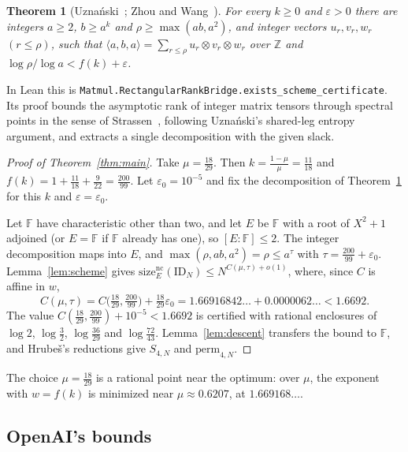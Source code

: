 \documentclass[11pt]{article}
\newtheorem{theorem}{Theorem}[section]
\theoremstyle{definition}
\theoremstyle{remark}
\newcommand{\F}{\mathbb{F}}
\newcommand{\Z}{\mathbb{Z}}
\newcommand{\ID}{\mathrm{ID}}
\newcommand{\size}{\mathrm{size}^{\mathrm{nc}}}
\newcommand{\lean}[1]{\texttt{#1}}
\begin{document}
\begin{theorem}[Uzna\'nski~\cite{Uznanski2026}; Zhou and Wang~\cite{ZhouWang2026}]\label{thm:uz}
For every $k\ge0$ and $\varepsilon>0$ there are integers $a\ge2$, $b\ge a^k$ and $\rho\ge\max(ab,a^2)$, and
integer vectors $u_r,v_r,w_r$ $(r\le\rho)$, such that $\langle a,b,a\rangle=\sum_{r\le\rho}u_r\otimes v_r\otimes
w_r$ over $\Z$ and $\log\rho/\log a<f(k)+\varepsilon$.
\end{theorem}

In Lean this is \lean{Matmul.RectangularRankBridge.exists\_scheme\_certificate}. Its proof bounds the asymptotic
rank of integer matrix tensors through spectral points in the sense of Strassen~\cite{Strassen1988}, following
Uzna\'nski's shared-leg entropy argument, and extracts a single decomposition with the given slack.

\begin{proof}[Proof of Theorem~\ref{thm:main}]
Take $\mu=\frac{18}{29}$. Then $k=\frac{1-\mu}{\mu}=\frac{11}{18}$ and $f(k)=1+\frac{11}{18}+\frac{9}{22}=\frac{200}{99}$.
Let $\varepsilon_0=10^{-5}$ and fix the decomposition of Theorem~\ref{thm:uz} for this $k$ and $\varepsilon=\varepsilon_0$.

Let $\F$ have characteristic other than two, and let $E$ be $\F$ with a root of $X^2+1$ adjoined (or $E=\F$ if
$\F$ already has one), so $[E:\F]\le2$. The integer decomposition maps into $E$, and
$\max(\rho,ab,a^2)=\rho\le a^{\tau}$ with $\tau=\frac{200}{99}+\varepsilon_0$. Lemma~\ref{lem:scheme} gives
$\size_E(\ID_N)\le N^{C(\mu,\tau)+o(1)}$, where, since $C$ is affine in $w$,
\[
C(\mu,\tau)=C\bigl(\tfrac{18}{29},\tfrac{200}{99}\bigr)+\tfrac{18}{29}\varepsilon_0
=1.66916842\ldots+0.0000062\ldots<1.6692 .
\]
The value $C(\frac{18}{29},\frac{200}{99})+10^{-5}<1.6692$ is certified with rational enclosures of $\log2$,
$\log\frac32$, $\log\frac{36}{29}$ and $\log\frac{72}{43}$. Lemma~\ref{lem:descent} transfers the bound to $\F$, and
Hrube\v{s}'s reductions give $S_{4,N}$ and $\mathrm{perm}_{4,N}$.
\end{proof}

The choice $\mu=\frac{18}{29}$ is a rational point near the optimum: over $\mu$, the exponent with $w=f(k)$ is
minimized near $\mu\approx0.6207$, at $1.669168\ldots$.

\subsection{OpenAI's bounds}\label{sec:oai}
\end{document}

